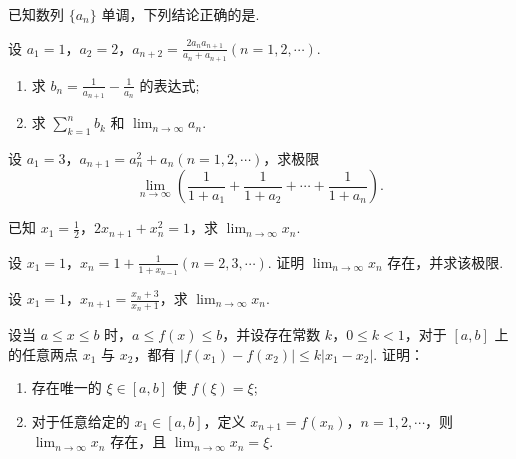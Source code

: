 	\begin{ti}
		已知数列 $\{ a_{n} \}$ 单调，下列结论正确的是\kuo.
	\end{ti}

	\begin{ti}
		设 $a_{1} = 1$，$a_{2} = 2$，$a_{n+2} = \frac{2a_{n}a_{n+1}}{a_{n} + a_{n+1}} (n=1,2,\cdots)$.
		\begin{enumerate}
			\item 求 $b_{n} = \frac{1}{a_{n+1}} - \frac{1}{a_{n}}$ 的表达式;
			\item 求 $\sum_{k=1}^{n} b_{k}$ 和 $\lim_{n \to \infty} a_{n}$.
		\end{enumerate}
	\end{ti}

	\begin{ti}
		设 $a_{1} = 3$，$a_{n+1} = a_{n}^{2} + a_{n}(n = 1,2,\cdots)$，求极限
		\[
			\lim_{n \to \infty} \left( \frac{1}{1 + a_{1}} + \frac{1}{1 + a_{2}} + \cdots + \frac{1}{1 + a_{n}} \right).
		\]
	\end{ti}
	
	\begin{ti}
		已知 $x_{1} = \frac{1}{2}$，$2 x_{n+1} + x_{n}^{2} = 1$，求 $\lim_{n \to \infty} x_{n}$.
	\end{ti}

	\begin{ti}
		设 $x_{1} = 1$，$x_{n} = 1 + \frac{1}{1 + x_{n-1}}(n = 2,3,\cdots)$. 证明 $\lim_{n \to \infty} x_{n}$ 存在，并求该极限.
	\end{ti}

	\begin{ti}
		设 $x_{1} = 1$，$x_{n+1} = \frac{x_{n} + 3}{x_{n} + 1}$，求 $\lim_{n \to \infty} x_{n}$.
	\end{ti}

	\begin{ti}
		设当 $a \leq x \leq b$ 时，$a \leq f(x) \leq b$，并设存在常数 $k$，$0 \leq k < 1$，对于 $[a,b]$ 上的任意两点 $x_{1}$ 与 $x_{2}$，都有 $|f(x_{1}) - f(x_{2})| \leq k |x_{1} - x_{2}|$. 证明：
		\begin{enumerate}
			\item 存在唯一的 $\xi \in [a,b]$ 使 $f(\xi) = \xi$;
			\item 对于任意给定的 $x_{1} \in [a,b]$，定义 $x_{n+1} = f(x_{n})$，$n = 1,2,\cdots$，则 $\lim_{n \to \infty} x_{n}$ 存在，且 $\lim_{n \to \infty} x_{n} = \xi$.
		\end{enumerate}
	\end{ti}

